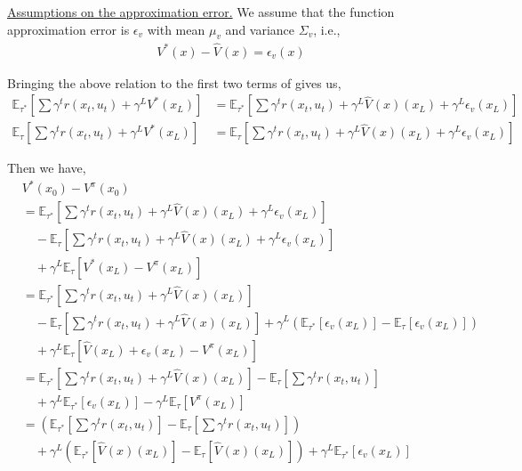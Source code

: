 \underline{ Assumptions on the approximation error.} We assume that the function approximation error is $\epsilon_v$ with mean $\mu_v$ and variance $\Sigma_v$, i.e.,
\begin{align*}
    V^{*}(x)-\hat{V}^{}(x) = \epsilon_v(x)
\end{align*}

Bringing the above relation to the first two terms of   gives us,
\begin{align*}
    \mathbb{E}_{\tau^* }\left[\sum \gamma^t r\left(x_t, u_t\right)+\gamma^L V^*\left(x_L\right)\right] & = \mathbb{E}_{\tau^* }\left[\sum \gamma^t r\left(x_t, u_t\right)+\gamma^L \hat{V}^{}(x)(x_L) + \gamma^L \epsilon_v(x_L)\right]\\
    \mathbb{E}_{{\tau}}\left[\sum \gamma^t r\left(x_t, u_t\right)+\gamma^L V^*\left(x_L\right)\right] &= \mathbb{E}_{{\tau}}\left[\sum \gamma^t r\left(x_t, u_t\right)+\gamma^L \hat{V}^{}(x)\left(x_L\right) + \gamma^L \epsilon_v(x_L)\right]
\end{align*}

Then we have,
\begin{align*}
    & V^{*}\left(x_0\right)-V^{{\pi}}\left(x_0\right) \\
    &= \mathbb{E}_{\tau^* }\left[\sum \gamma^t r\left(x_t, u_t\right)+\gamma^L \hat{V}^{}(x)(x_L) + \gamma^L \epsilon_v(x_L)\right]\\
    &\quad -\mathbb{E}_{{\tau}}\left[\sum \gamma^t r\left(x_t, u_t\right)+\gamma^L \hat{V}^{}(x)\left(x_L\right) + \gamma^L \epsilon_v(x_L)\right]\\
    &\quad +\gamma^L \mathbb{E}_{{\tau}}\left[V^*\left(x_L\right)-V^{{\pi}}\left(x_L\right)\right]\\
    &=\mathbb{E}_{\tau^* }\left[\sum \gamma^t r\left(x_t, u_t\right)+\gamma^L\hat{V}^{}(x)(x_L) \right]\\
    & \quad -\mathbb{E}_{{\tau}}\left[\sum \gamma^t r\left(x_t, u_t\right)+\gamma^L \hat{V}^{}(x)\left(x_L\right)\right]+\gamma^L\left(\mathbb{E}_{\tau^{*}}[ \epsilon_v(x_L)]-\mathbb{E}_{\tau^{}}[  \epsilon_v(x_L)]\right)\\
    &\quad + \gamma^L \mathbb{E}_{{\tau}}\left[\hat{V}\left(x_L\right) +\epsilon_v(x_L)-V^{{\pi}}\left(x_L\right)\right]\\
    &= \mathbb{E}_{\tau^* }\left[\sum \gamma^t r\left(x_t, u_t\right)+\gamma^L\hat{V}^{}(x)(x_L) \right]-\mathbb{E}_{{\tau}}\left[\sum \gamma^t r\left(x_t, u_t\right)\right]\\
    &\quad+\gamma^L\mathbb{E}_{\tau^{*}}[ \epsilon_v(x_L)] - \gamma^L \mathbb{E}_{{\tau}}\left[V^{{\pi}}\left(x_L\right)\right]\\
    &=\left(\mathbb{E}_{\tau^* }\left[ \sum \gamma^t r\left(x_t, u_t\right)\right]-\mathbb{E}_{\tau }\left[ \sum \gamma^t r\left(x_t, u_t\right)\right]\right)\\
    &\quad+\gamma^L \left(\mathbb{E}_{\tau^* }\left[\hat{V}^{}(x)(x_L) \right]-\mathbb{E}_{\tau }\left[\hat{V}^{}(x)(x_L) \right]\right)+\gamma^L\mathbb{E}_{\tau^{*}}[ \epsilon_v(x_L)]
\end{align*}

